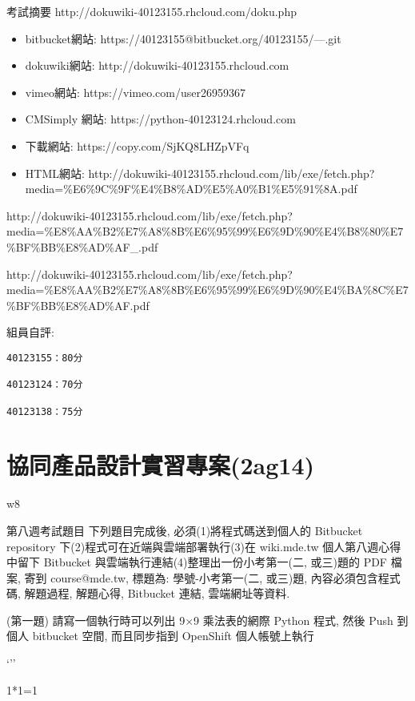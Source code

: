 \documentclass[]{article}
\begin{document}
考試摘要 http://dokuwiki-40123155.rhcloud.com/doku.php

\begin{itemize}
\item
  bitbucket網站: https://40123155@bitbucket.org/40123155/---.git
\item
  dokuwiki網站: http://dokuwiki-40123155.rhcloud.com
\item
  vimeo網站: https://vimeo.com/user26959367
\item
  CMSimply 網站: https://python-40123124.rhcloud.com
\item
  下載網站: https://copy.com/SjKQ8LHZpVFq
\item
  HTML網站:
  http://dokuwiki-40123155.rhcloud.com/lib/exe/fetch.php?media=\%E6\%9C\%9F\%E4\%B8\%AD\%E5\%A0\%B1\%E5\%91\%8A.pdf
\end{itemize}

http://dokuwiki-40123155.rhcloud.com/lib/exe/fetch.php?media=\%E8\%AA\%B2\%E7\%A8\%8B\%E6\%95\%99\%E6\%9D\%90\%E4\%B8\%80\%E7\%BF\%BB\%E8\%AD\%AF\_.pdf

http://dokuwiki-40123155.rhcloud.com/lib/exe/fetch.php?media=\%E8\%AA\%B2\%E7\%A8\%8B\%E6\%95\%99\%E6\%9D\%90\%E4\%BA\%8C\%E7\%BF\%BB\%E8\%AD\%AF.pdf

組員自評:

\begin{verbatim}
40123155：80分

40123124：70分

40123138：75分
\end{verbatim}

\section{﻿協同產品設計實習專案(2ag14)}\label{ux5354ux540cux7522ux54c1ux8a2dux8a08ux5be6ux7fd2ux5c08ux68482ag14}

w8

第八週考試題目 下列題目完成後, 必須(1)將程式碼送到個人的 Bitbucket
repository 下(2)程式可在近端與雲端部署執行(3)在 wiki.mde.tw
個人第八週心得中留下 Bitbucket 與雲端執行連結(4)整理出一份小考第一(二,
或三)題的 PDF 檔案, 寄到 course@mde.tw, 標題為: 學號-小考第一(二,
或三)題, 內容必須包含程式碼, 解題過程, 解題心得, Bitbucket 連結,
雲端網址等資料.

(第一題) 請寫一個執行時可以列出 9×9 乘法表的網際 Python 程式, 然後 Push
到個人 bitbucket 空間, 而且同步指到 OpenShift 個人帳號上執行

`''

1*1=1
\end{document}
